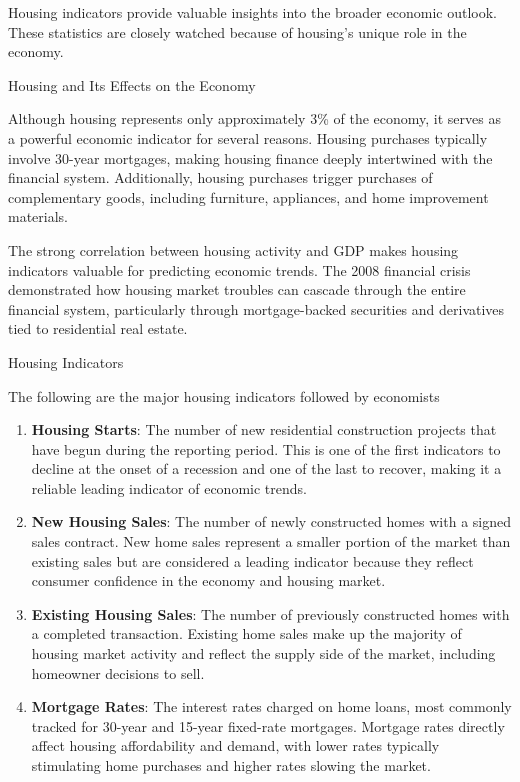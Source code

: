 \documentclass[10pt]{article}
\begin{document}
    Housing indicators provide valuable insights into the broader economic outlook. These statistics are closely watched because of housing's unique role in the economy.

    \begin{core}{Housing and Its Effects on the Economy}

      Although housing represents only approximately 3\% of the economy, it serves as a powerful economic indicator for several reasons. Housing purchases typically involve 30-year mortgages, making housing finance deeply intertwined with the financial system. Additionally, housing purchases trigger purchases of complementary goods, including furniture, appliances, and home improvement materials.

      The strong correlation between housing activity and GDP makes housing indicators valuable for predicting economic trends. The 2008 financial crisis demonstrated how housing market troubles can cascade through the entire financial system, particularly through mortgage-backed securities and derivatives tied to residential real estate.

    \end{core}

    \begin{core}{Housing Indicators}

      The following are the major housing indicators followed by economists

      \begin{enumerate}

        \item \textbf{Housing Starts}: The number of new residential construction projects that have begun during the reporting period. This is one of the first indicators to decline at the onset of a recession and one of the last to recover, making it a reliable leading indicator of economic trends.

        \item \textbf{New Housing Sales}: The number of newly constructed homes with a signed sales contract. New home sales represent a smaller portion of the market than existing sales but are considered a leading indicator because they reflect consumer confidence in the economy and housing market.

        \item \textbf{Existing Housing Sales}: The number of previously constructed homes with a completed transaction. Existing home sales make up the majority of housing market activity and reflect the supply side of the market, including homeowner decisions to sell.

        \item \textbf{Mortgage Rates}: The interest rates charged on home loans, most commonly tracked for 30-year and 15-year fixed-rate mortgages. Mortgage rates directly affect housing affordability and demand, with lower rates typically stimulating home purchases and higher rates slowing the market.

      \end{enumerate}

    \end{core}    
\end{document}
